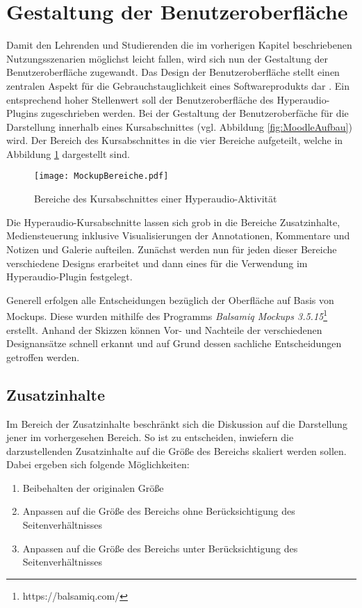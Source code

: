 \section{Gestaltung der Benutzeroberfläche}
Damit den Lehrenden und Studierenden die im vorherigen Kapitel beschriebenen Nutzungsszenarien möglichst leicht fallen, wird sich nun der Gestaltung der Benutzeroberfläche zugewandt. \glqq Das Design der Benutzeroberfläche stellt einen zentralen Aspekt für die Gebrauchstauglichkeit eines Softwareprodukts dar\grqq{} \citep[S. 1]{oppermann2002user}. Ein entsprechend hoher Stellenwert soll der Benutzeroberfläche des Hyperaudio-Plugins zugeschrieben werden. Bei der Gestaltung der Benutzeroberfäche für die Darstellung innerhalb eines Kursabschnittes (vgl. Abbildung \ref{fig:MoodleAufbau}) wird. Der Bereich des Kursabschnittes in die vier Bereiche aufgeteilt, welche in Abbildung \ref{fig:MockupBereiche} dargestellt sind. 

\begin{figure}[h!]
\texttt{[image: MockupBereiche.pdf]}
\caption{\label{fig:MockupBereiche} Bereiche des Kursabschnittes einer Hyperaudio-Aktivität}
\end{figure}

Die Hyperaudio-Kursabschnitte lassen sich grob in die Bereiche Zusatzinhalte, Mediensteuerung inklusive Visualisierungen der Annotationen, Kommentare und Notizen und Galerie aufteilen. Zunächst werden nun für jeden dieser Bereiche verschiedene Designs erarbeitet und dann eines für die Verwendung im Hyperaudio-Plugin festgelegt.

Generell erfolgen alle Entscheidungen bezüglich der Oberfläche auf Basis von Mockups. Diese wurden mithilfe des Programms \textit{Balsamiq Mockups 3.5.15}\footnote{https://balsamiq.com/} erstellt. Anhand der Skizzen können Vor- und Nachteile der verschiedenen Designansätze schnell erkannt und auf Grund dessen sachliche Entscheidungen getroffen werden. 

\subsection{Zusatzinhalte}
\label{sub:zusatzinhalte}
Im Bereich der Zusatzinhalte beschränkt sich die Diskussion auf die Darstellung jener im vorhergesehen Bereich. So ist zu entscheiden, inwiefern die darzustellenden Zusatzinhalte auf die Größe des Bereichs skaliert werden sollen. Dabei ergeben sich folgende Möglichkeiten:

\begin{enumerate}
\item Beibehalten der originalen Größe
\item Anpassen auf die Größe des Bereichs ohne Berücksichtigung des Seitenverhältnisses
\item Anpassen auf die Größe des Bereichs unter Berücksichtigung des Seitenverhältnisses
\end{enumerate}

